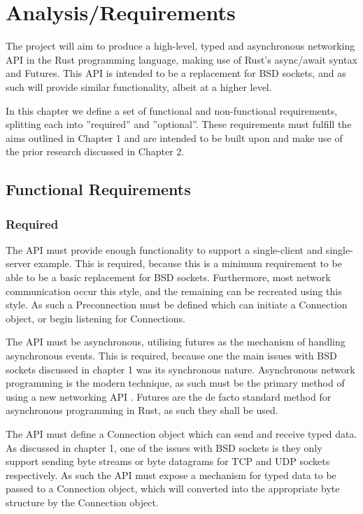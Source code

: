 \documentclass{l4proj}
\begin{document}
\chapter{Analysis/Requirements}\label{ch:analysis/requirements}
The project will aim to produce a high-level, typed and asynchronous networking API in the Rust programming language,
making use of Rust's async/await syntax and Futures.
This API is intended to be a replacement for BSD sockets, and as such will provide similar functionality, albeit at a
higher level.

In this chapter we define a set of functional and non-functional requirements, splitting each into ''required'' and
''optional''.
These requirements must fulfill the aims outlined in Chapter 1 and are intended to be built upon and make use of the
prior research discussed in Chapter 2.

\section{Functional Requirements}\label{sec:functional-requirements}

\subsection{Required}\label{subsec:required}

The API must provide enough functionality to support a single-client and single-server example.
This is required, because this is a minimum requirement to be able to be a basic replacement for BSD sockets.
Furthermore, most network communication occur this style, and the remaining can be recreated using this style.
As such a Preconnection must be defined which can initiate a Connection object, or begin listening for Connections.

The API must be asynchronous, utilising futures as the mechanism of handling asynchronous events.
This is required, because one the main issues with BSD sockets discussed in chapter 1 was its synchronous nature.
Asynchronous network programming is the modern technique, as such must be the primary method of using a new networking
API .
Futures are the de facto standard method for asynchronous programming in Rust, as such they shall be used.

The API must define a Connection object which can send and receive typed data.
As discussed in chapter 1, one of the issues with BSD sockets is they only support sending byte streams or byte
datagrams for TCP and UDP sockets respectively.
As such the API must expose a mechanism for typed data to be passed to a Connection object, which will converted into
the appropriate byte structure by the Connection object.
\end{document}
